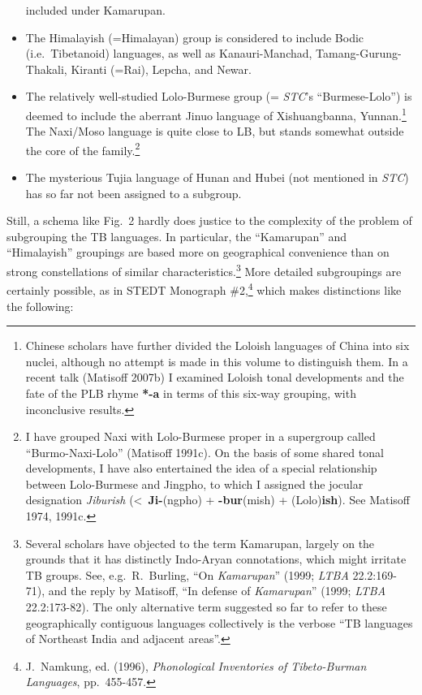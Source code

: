 \begin{itemize}
included under Kamarupan.
\item The Himalayish (=Himalayan) group is considered to include Bodic (i.e.\
\mbox{Tibetanoid}) languages, as well as Kanauri-Manchad, Tamang-Gurung-Thakali,
Kiranti (=Rai), Lepcha, and Newar.
\item The relatively well-studied Lolo-Burmese group (= \textit{STC}’s “Burmese-Lolo”) is
deemed to include the aberrant Jinuo language of Xishuangbanna,
Yunnan.\footnote{Chinese scholars have further divided the Loloish languages of
China into six nuclei, although no attempt is made in this volume to distinguish
them.  In a recent talk (Matisoff 2007b) I examined Loloish tonal developments
and the fate of the PLB rhyme \textbf{*-a} in terms of this six-way grouping, with
inconclusive results.}  The Naxi/Moso language is quite close to LB, but stands
somewhat outside the core of the family.\footnote{I have grouped Naxi with
Lolo-Burmese proper in a supergroup called “Burmo-Naxi-Lolo” (Matisoff 1991c). 
On the basis of some shared tonal developments, I have also entertained the idea
of a special relationship between Lolo-Burmese and Jingpho, to which I assigned
the jocular designation \textit{Jiburish} (<~\textbf{Ji-}(ngpho)
+ \textbf{-bur}(mish) + (Lolo)\textbf{ish}).  See
Matisoff 1974, 1991c.}
\item The mysterious Tujia language of Hunan and Hubei (not mentioned in \textit{STC}) has so
far not been assigned to a subgroup.
\end{itemize}


Still, a schema like Fig.~2 hardly does justice to the complexity
of the problem of subgrouping the TB languages.  In particular, the “Kamarupan”
and “Himalayish” groupings are based more on geographical convenience than on
strong constellations of similar characteristics.\footnote{Several scholars have objected to the term Kamarupan,
largely on the grounds that it has distinctly Indo-Aryan connotations, which
might irritate TB groups.  See, e.g.\ R.~Burling, “On \textit{Kamarupan}” (1999; \textit{LTBA}
22.2:169-71), and the reply by Matisoff, “In defense of \textit{Kamarupan}”
(1999; \textit{LTBA} 22.2:173-82).  The only alternative term
suggested so far to refer to these
geographically contiguous languages collectively is the verbose “TB languages of
Northeast India and adjacent areas”.}
More detailed subgroupings are certainly possible, as in
STEDT Monograph \#2,\footnote{J.~Namkung, ed. (1996),
\textit{Phonological Inventories of Tibeto-Burman Languages},
pp.~455-457.}
which makes distinctions like the following:


